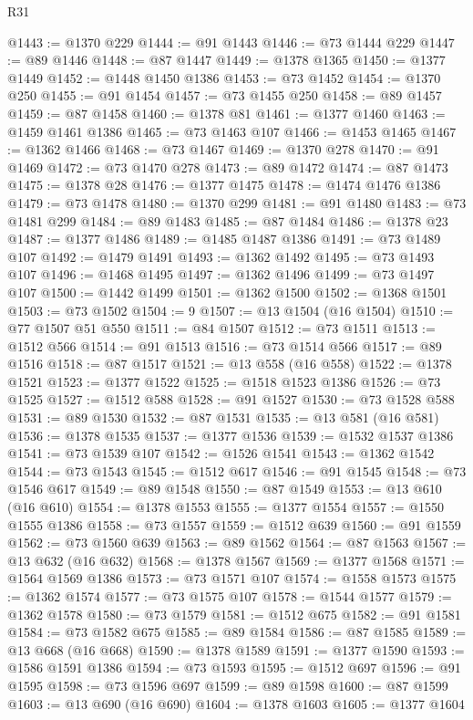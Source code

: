 \begin{lexlean}{R31}
\begin{coremodule}
@1443 := @1370 @229
@1444 := @91 @1443
@1446 := @73 @1444 @229
@1447 := @89 @1446
@1448 := @87 @1447
@1449 := @1378 @1365
@1450 := @1377 @1449
@1452 := @1448 @1450 @1386
@1453 := @73 @1452
@1454 := @1370 @250
@1455 := @91 @1454
@1457 := @73 @1455 @250
@1458 := @89 @1457
@1459 := @87 @1458
@1460 := @1378 @81
@1461 := @1377 @1460
@1463 := @1459 @1461 @1386
@1465 := @73 @1463 @107
@1466 := @1453 @1465
@1467 := @1362 @1466
@1468 := @73 @1467
@1469 := @1370 @278
@1470 := @91 @1469
@1472 := @73 @1470 @278
@1473 := @89 @1472
@1474 := @87 @1473
@1475 := @1378 @28
@1476 := @1377 @1475
@1478 := @1474 @1476 @1386
@1479 := @73 @1478
@1480 := @1370 @299
@1481 := @91 @1480
@1483 := @73 @1481 @299
@1484 := @89 @1483
@1485 := @87 @1484
@1486 := @1378 @23
@1487 := @1377 @1486
@1489 := @1485 @1487 @1386
@1491 := @73 @1489 @107
@1492 := @1479 @1491
@1493 := @1362 @1492
@1495 := @73 @1493 @107
@1496 := @1468 @1495
@1497 := @1362 @1496
@1499 := @73 @1497 @107
@1500 := @1442 @1499
@1501 := @1362 @1500
@1502 := @1368 @1501
@1503 := @73 @1502
@1504 := 9
@1507 := @13 @1504 (@16 @1504)
@1510 := @77 @1507 @51 @550
@1511 := @84 @1507
@1512 := @73 @1511
@1513 := @1512 @566
@1514 := @91 @1513
@1516 := @73 @1514 @566
@1517 := @89 @1516
@1518 := @87 @1517
@1521 := @13 @558 (@16 @558)
@1522 := @1378 @1521
@1523 := @1377 @1522
@1525 := @1518 @1523 @1386
@1526 := @73 @1525
@1527 := @1512 @588
@1528 := @91 @1527
@1530 := @73 @1528 @588
@1531 := @89 @1530
@1532 := @87 @1531
@1535 := @13 @581 (@16 @581)
@1536 := @1378 @1535
@1537 := @1377 @1536
@1539 := @1532 @1537 @1386
@1541 := @73 @1539 @107
@1542 := @1526 @1541
@1543 := @1362 @1542
@1544 := @73 @1543
@1545 := @1512 @617
@1546 := @91 @1545
@1548 := @73 @1546 @617
@1549 := @89 @1548
@1550 := @87 @1549
@1553 := @13 @610 (@16 @610)
@1554 := @1378 @1553
@1555 := @1377 @1554
@1557 := @1550 @1555 @1386
@1558 := @73 @1557
@1559 := @1512 @639
@1560 := @91 @1559
@1562 := @73 @1560 @639
@1563 := @89 @1562
@1564 := @87 @1563
@1567 := @13 @632 (@16 @632)
@1568 := @1378 @1567
@1569 := @1377 @1568
@1571 := @1564 @1569 @1386
@1573 := @73 @1571 @107
@1574 := @1558 @1573
@1575 := @1362 @1574
@1577 := @73 @1575 @107
@1578 := @1544 @1577
@1579 := @1362 @1578
@1580 := @73 @1579
@1581 := @1512 @675
@1582 := @91 @1581
@1584 := @73 @1582 @675
@1585 := @89 @1584
@1586 := @87 @1585
@1589 := @13 @668 (@16 @668)
@1590 := @1378 @1589
@1591 := @1377 @1590
@1593 := @1586 @1591 @1386
@1594 := @73 @1593
@1595 := @1512 @697
@1596 := @91 @1595
@1598 := @73 @1596 @697
@1599 := @89 @1598
@1600 := @87 @1599
@1603 := @13 @690 (@16 @690)
@1604 := @1378 @1603
@1605 := @1377 @1604

\end{coremodule}
\end{lexlean}
